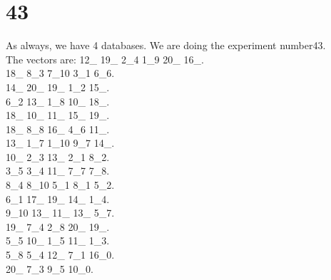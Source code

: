\chapter{43}
\indent As always, we have 4 databases. We are doing the experiment number43.\\
The vectors are:
12\_ 19\_ 2\_4 1\_9 20\_ 16\_.\\18\_ 8\_3 7\_10 3\_1 6\_6.\\14\_ 20\_ 19\_ 1\_2 15\_.\\6\_2 13\_ 1\_8 10\_ 18\_.\\18\_ 10\_ 11\_ 15\_ 19\_.\\18\_ 8\_8 16\_ 4\_6 11\_.\\13\_ 1\_7 1\_10 9\_7 14\_.\\10\_ 2\_3 13\_ 2\_1 8\_2.\\3\_5 3\_4 11\_ 7\_7 7\_8.\\8\_4 8\_10 5\_1 8\_1 5\_2.\\6\_1 17\_ 19\_ 14\_ 1\_4.\\9\_10 13\_ 11\_ 13\_ 5\_7.\\19\_ 7\_4 2\_8 20\_ 19\_.\\5\_5 10\_ 1\_5 11\_ 1\_3.\\5\_8 5\_4 12\_ 7\_1 16\_0.\\20\_ 7\_3 9\_5 10\_0.\\